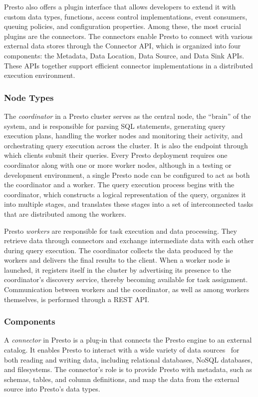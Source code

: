\documentclass[conference]{IEEEtran}
\begin{document}
Presto also offers a plugin interface that allows developers to extend it with custom data types, functions, access control implementations, event consumers, queuing policies, and configuration properties. Among these, the most crucial plugins are the connectors. The connectors enable Presto to connect with various external data stores through the Connector API, which is organized into four components: the Metadata, Data Location, Data Source, and Data Sink APIs. These APIs together support efficient connector implementations in a distributed execution environment.

\subsubsection{Node Types}

The \textit{coordinator} in a Presto cluster serves as the central node, the “brain” of the system, and is responsible for parsing SQL statements, generating query execution plans, handling the worker nodes and monitoring their activity, and orchestrating query execution across the cluster. It is also the endpoint through which clients submit their queries. Every Presto deployment requires one coordinator along with one or more worker nodes, although in a testing or development environment, a single Presto node can be configured to act as both the coordinator and a worker. The query execution process begins with the coordinator, which constructs a logical representation of the query, organizes it into multiple stages, and translates these stages into a set of interconnected tasks that are distributed among the workers.

Presto \textit{workers} are responsible for task execution and data processing. They retrieve data through connectors and exchange intermediate data with each other during query execution. The coordinator collects the data produced by the workers and delivers the final results to the client. When a worker node is launched, it registers itself in the cluster by advertising its presence to the coordinator’s discovery service, thereby becoming available for task assignment. Communication between workers and the coordinator, as well as among workers themselves, is performed through a REST API.


\subsubsection{Components}

A \textit{connector} in Presto is a plug-in that connects the Presto engine to an external catalog. It enables Presto to interact with a wide variety of data sources  for both reading and writing data, including relational databases, NoSQL databases, and filesystems. The connector’s role is to provide Presto with metadata, such as schemas, tables, and column definitions, and map the data from the external source into Presto’s data types. \cite{b7}
\end{document}
